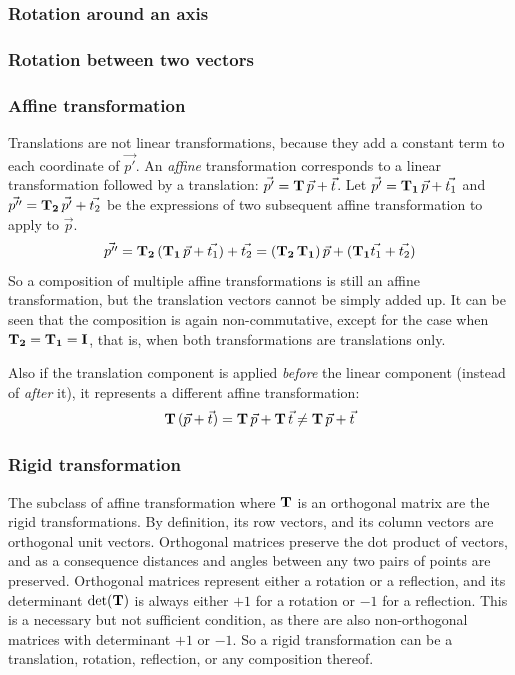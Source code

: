 \subsubsection{Rotation around an axis}

\subsubsection{Rotation between two vectors}

\subsubsection{Affine transformation}
Translations are not linear transformations, because they add a constant term to each coordinate of $\vec{p'}$. An \emph{affine} transformation corresponds to a linear transformation followed by a translation: $\vec{p'} = \mathbf{T} \, \vec{p} + \vec{t}$. Let $\vec{p'} = \mathbf{T_1} \, \vec{p} + \vec{t_1}$ and $\vec{p''} = \mathbf{T_2} \, \vec{p'} + \vec{t_2}$ be the expressions of two subsequent affine transformation to apply to $\vec{p}$.
\begin{equation}
	\vec{p''} = \mathbf{T_2} \, (\mathbf{T_1} \, \vec{p} + \vec{t_1}) + \vec{t_2} = (\mathbf{T_2} \, \mathbf{T_1}) \, \vec{p} + (\mathbf{T_1} \vec{t_1} + \vec{t_2})
\end{equation}
So a composition of multiple affine transformations is still an affine transformation, but the translation vectors cannot be simply added up. It can be seen that the composition is again non-commutative, except for the case when $\mathbf{T_2} = \mathbf{T_1} = \mathbf{I}$, that is, when both transformations are translations only.

Also if the translation component is applied \emph{before} the linear component (instead of \emph{after} it), it represents a different affine transformation:
\begin{equation}
	\mathbf{T} \, (\vec{p} + \vec{t}) = \mathbf{T} \, \vec{p} + \mathbf{T} \, \vec{t} \neq \mathbf{T} \, \vec{p} + \vec{t}
\end{equation}

\subsubsection{Rigid transformation}
The subclass of affine transformation where $\mathbf{T}$ is an orthogonal matrix are the rigid transformations. By definition, its row vectors, and its column vectors are orthogonal unit vectors. Orthogonal matrices preserve the dot product of vectors, and as a consequence distances and angles between any two pairs of points are preserved. Orthogonal matrices represent either a rotation or a reflection, and its determinant $\det(\mathbf{T})$ is always either $+1$ for a rotation or $-1$ for a reflection. This is a necessary but not sufficient condition, as there are also non-orthogonal matrices with determinant $+1$ or $-1$. So a rigid transformation can be a translation, rotation, reflection, or any composition thereof.

